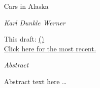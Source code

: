 \documentclass[11pt,letterpaper,oneside]{article}
\begin{document}
\thispagestyle{empty}
\setcounter{page}{0}
\vspace*{0.7in plus 0.3in minus 0.3in}

\begin{center}
    {\Huge Cars in Alaska}

    \textit{\Large Karl Dunkle Werner}

\vspace{1em}
  This draft: \gitCommitterDate{}
    \href{https://github.com/karldw/second_year_paper/tree/\gitHash}{
    (\textsc{\gitAbbrevHash{}})}\\
    \href{http://karldw.org/second_year_paper.pdf}{Click here for the most recent.}
\end{center}

\vspace{2in plus 1in minus 0.7in}

\begin{center}
    \begin{minipage}{0.7\linewidth}
        \begin{center}
            \textit{Abstract}
        \end{center}
        Abstract text here \ldots
    \end{minipage}
\end{center}
\end{document}
